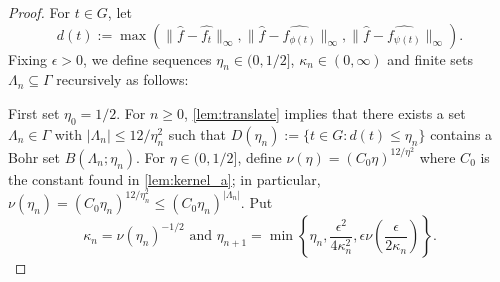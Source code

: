 \documentclass[10pt]{article}
\theoremstyle{definition}
\begin{document}
\begin{proof}
For $t \in G$, let
		\[
			d(t) := \max \left( \| \widehat{f} - \widehat{f_{t}} \|_\infty, \| \widehat{f} - \widehat{f_{\phi(t)}} \|_\infty, \| \widehat{f} - \widehat{f_{\psi(t)}} \|_\infty  \right).
		\]
Fixing $\epsilon > 0$, we define sequences $\eta_n \in (0, 1/2]$, $\kappa_n \in (0, \infty)$ and finite sets $\Lambda_n \subseteq \Gamma$ recursively as follows: 

First set $\eta_0 = 1/2$. For $n \geq 0$, \cref{lem:translate} implies that there exists a set $\Lambda_n \in \Gamma$ with $|\Lambda_n| \leq 12/\eta_n^2$ such that $D(\eta_n) := \{t \in G: d(t) \leq \eta_n\}$ contains a Bohr set $B(\Lambda_n; \eta_n)$.  
For $\eta \in (0, 1/2]$, define $\nu(\eta) = (C_0 \eta)^{12/\eta^2}$ where $C_0$ is the constant found in \cref{lem:kernel_a}; in particular, $\nu(\eta_n) = (C_0 \eta_n)^{12/\eta_n^2} \leq (C_0 \eta_n)^{|\Lambda_n|}$. Put
\[
         \kappa_n = \nu(\eta_n)^{-1/2} \text{ and } \eta_{n+1} = \min \left \{\eta_n, \frac{\epsilon^2}{4 \kappa_n^2}, \epsilon \nu \left( \frac{\epsilon}{2 \kappa_n} \right) \right\}.
\]


\end{proof}
\end{document}
